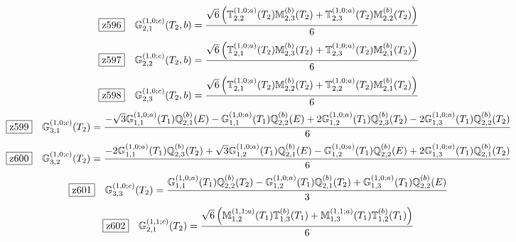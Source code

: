 \documentclass[fleqn,10pt,landscape]{jsarticle}
\begin{document}
\begin{dmath*}
\hspace*{3mm}\fbox{z596}\quad \mathbb{G}_{2,1}^{(1,0;c)}(T_{2},b)=\frac{\sqrt{6} \left(\mathbb{T}_{2,2}^{(1,0;a)}(T_{2}) \mathbb{M}_{2,3}^{(b)}(T_{2}) + \mathbb{T}_{2,3}^{(1,0;a)}(T_{2}) \mathbb{M}_{2,2}^{(b)}(T_{2})\right)}{6}
\end{dmath*}
\begin{dmath*}
\hspace*{3mm}\fbox{z597}\quad \mathbb{G}_{2,2}^{(1,0;c)}(T_{2},b)=\frac{\sqrt{6} \left(\mathbb{T}_{2,1}^{(1,0;a)}(T_{2}) \mathbb{M}_{2,3}^{(b)}(T_{2}) + \mathbb{T}_{2,3}^{(1,0;a)}(T_{2}) \mathbb{M}_{2,1}^{(b)}(T_{2})\right)}{6}
\end{dmath*}
\begin{dmath*}
\hspace*{3mm}\fbox{z598}\quad \mathbb{G}_{2,3}^{(1,0;c)}(T_{2},b)=\frac{\sqrt{6} \left(\mathbb{T}_{2,1}^{(1,0;a)}(T_{2}) \mathbb{M}_{2,2}^{(b)}(T_{2}) + \mathbb{T}_{2,2}^{(1,0;a)}(T_{2}) \mathbb{M}_{2,1}^{(b)}(T_{2})\right)}{6}
\end{dmath*}
\begin{dmath*}
\hspace*{3mm}\fbox{z599}\quad \mathbb{G}_{3,1}^{(1,0;c)}(T_{2})=\frac{- \sqrt{3} \mathbb{G}_{1,1}^{(1,0;a)}(T_{1}) \mathbb{Q}_{2,1}^{(b)}(E) - \mathbb{G}_{1,1}^{(1,0;a)}(T_{1}) \mathbb{Q}_{2,2}^{(b)}(E) + 2 \mathbb{G}_{1,2}^{(1,0;a)}(T_{1}) \mathbb{Q}_{2,3}^{(b)}(T_{2}) - 2 \mathbb{G}_{1,3}^{(1,0;a)}(T_{1}) \mathbb{Q}_{2,2}^{(b)}(T_{2})}{6}
\end{dmath*}
\begin{dmath*}
\hspace*{3mm}\fbox{z600}\quad \mathbb{G}_{3,2}^{(1,0;c)}(T_{2})=\frac{- 2 \mathbb{G}_{1,1}^{(1,0;a)}(T_{1}) \mathbb{Q}_{2,3}^{(b)}(T_{2}) + \sqrt{3} \mathbb{G}_{1,2}^{(1,0;a)}(T_{1}) \mathbb{Q}_{2,1}^{(b)}(E) - \mathbb{G}_{1,2}^{(1,0;a)}(T_{1}) \mathbb{Q}_{2,2}^{(b)}(E) + 2 \mathbb{G}_{1,3}^{(1,0;a)}(T_{1}) \mathbb{Q}_{2,1}^{(b)}(T_{2})}{6}
\end{dmath*}
\begin{dmath*}
\hspace*{3mm}\fbox{z601}\quad \mathbb{G}_{3,3}^{(1,0;c)}(T_{2})=\frac{\mathbb{G}_{1,1}^{(1,0;a)}(T_{1}) \mathbb{Q}_{2,2}^{(b)}(T_{2}) - \mathbb{G}_{1,2}^{(1,0;a)}(T_{1}) \mathbb{Q}_{2,1}^{(b)}(T_{2}) + \mathbb{G}_{1,3}^{(1,0;a)}(T_{1}) \mathbb{Q}_{2,2}^{(b)}(E)}{3}
\end{dmath*}
\begin{dmath*}
\hspace*{3mm}\fbox{z602}\quad \mathbb{G}_{2,1}^{(1,1;c)}(T_{2})=\frac{\sqrt{6} \left(\mathbb{M}_{1,2}^{(1,1;a)}(T_{1}) \mathbb{T}_{1,3}^{(b)}(T_{1}) + \mathbb{M}_{1,3}^{(1,1;a)}(T_{1}) \mathbb{T}_{1,2}^{(b)}(T_{1})\right)}{6}
\end{dmath*}
\end{document}
